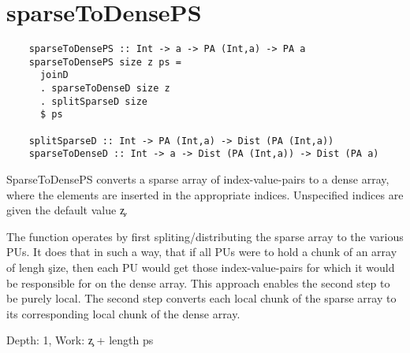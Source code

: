
\section{sparseToDensePS}
  \begin{lstlisting}
    sparseToDensePS :: Int -> a -> PA (Int,a) -> PA a
    sparseToDensePS size z ps = 
      joinD
      . sparseToDenseD size z
      . splitSparseD size
      $ ps

    splitSparseD :: Int -> PA (Int,a) -> Dist (PA (Int,a))
    sparseToDenseD :: Int -> a -> Dist (PA (Int,a)) -> Dist (PA a)
  \end{lstlisting}
  SparseToDensePS converts a sparse array of index-value-pairs
  to a dense array, where the elements are inserted in the appropriate
  indices. Unspecified indices are given the default value \c{z}.

  The function operates by first spliting/distributing the sparse array
  to the various PUs. It does that in such a way, that if all PUs were to
  hold a chunk of an array of lengh \c{size}, then each PU would get
  those index-value-pairs for which it would be responsible for on the
  dense array. This approach enables the second step to be purely local.
  The second step converts each local chunk of the sparse array to its corresponding
  local chunk of the dense array.

  Depth: 1, Work: \c{z + length ps}

